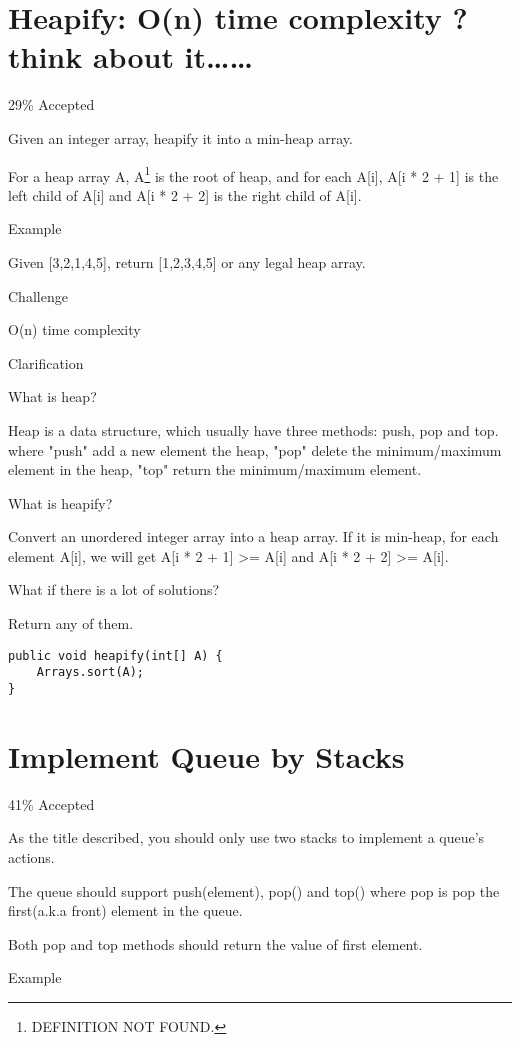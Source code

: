 \documentclass[12pt]{book}
\begin{document}
\chapter{Heapify: O(n) time complexity ? think about it\ldots{}\ldots{}}
\label{sec-30}

29\% Accepted

Given an integer array, heapify it into a min-heap array.

For a heap array A, A\footnote{DEFINITION NOT FOUND.} is the root of heap, and for each A[i], A[i * 2 + 1] is the left child of A[i] and A[i * 2 + 2] is the right child of A[i].

Example

Given [3,2,1,4,5], return [1,2,3,4,5] or any legal heap array.

Challenge

O(n) time complexity

Clarification

What is heap?

Heap is a data structure, which usually have three methods: push, pop and top. where "push" add a new element the heap, "pop" delete the minimum/maximum element in the heap, "top" return the minimum/maximum element.

What is heapify?

Convert an unordered integer array into a heap array. If it is min-heap, for each element A[i], we will get A[i * 2 + 1] >= A[i] and A[i * 2 + 2] >= A[i].

What if there is a lot of solutions?

Return any of them.
\lstset{language=java,label= ,caption= ,numbers=none}
\begin{lstlisting}
public void heapify(int[] A) {
    Arrays.sort(A);
}
\end{lstlisting}
\chapter{Implement Queue by Stacks}
\label{sec-31}

41\% Accepted

As the title described, you should only use two stacks to implement a queue's actions.

The queue should support push(element), pop() and top() where pop is pop the first(a.k.a front) element in the queue.

Both pop and top methods should return the value of first element.

Example
\end{document}
